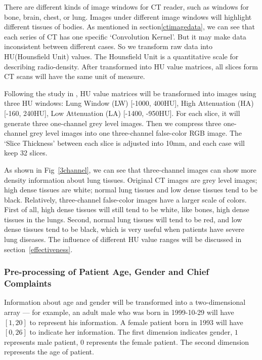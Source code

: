 \documentclass[journal]{IEEEtran}
\begin{document}
There are different kinds of image windows for CT reader, such as windows for bone, brain, chest, or lung. Images under different image windows will highlight different tissues of bodies.
As mentioned in section\ref{ctimagedata}, we can see that each series of CT has one specific `Convolution Kernel'. But it may make data inconsistent between different cases. So we transform raw data into HU(Hounsfield Unit) values. The Hounsfield Unit is a quantitative scale for describing radio-density. After transformed into HU value matrices, all slices form CT scans will have the same unit of measure.

Following the study in \cite{Shin2017Three, gao2018holistic}, HU value matrices will be transformed into images using three HU windows: Lung Window (LW) [-1000, 400HU], High Attenuation (HA) [-160, 240HU], Low Attenuation (LA) [-1400, -950HU]. 
For each slice, it will generate three one-channel grey level images. Then we compress three one-channel grey level images into one three-channel false-color RGB image. The `Slice Thickness' between each slice is adjusted into 10mm, and each case will keep 32 slices.

As shown in Fig~\ref{3channel}, we can see that three-channel images can show more density information about lung tissues. Original CT images are grey level images; high dense tissues are white; normal lung tissues and low dense tissues tend to be black. 
Relatively, three-channel false-color images have a larger scale of colors. First of all, high dense tissues will still tend to be white, like bones, high dense tissues in the lungs. Second, normal lung tissues will tend to be red, and low dense tissues tend to be black, which is very useful when patients have severe lung diseases.
The influence of different HU value ranges will be discussed in section~\ref{effectiveness}.
    
\subsubsection{Pre-processing of Patient Age, Gender and Chief Complaints}
\label{textdata}
Information about age and gender will be transformed into a two-dimensional array — for example, an adult male who was born in 1999-10-29 will have $[1, 20]$ to represent his information. A female patient born in 1993 will have $[0, 26]$ to indicate her information. The first dimension indicates gender, $1$ represents male patient, $0$ represents the female patient. The second dimension represents the age of patient.
\end{document}

